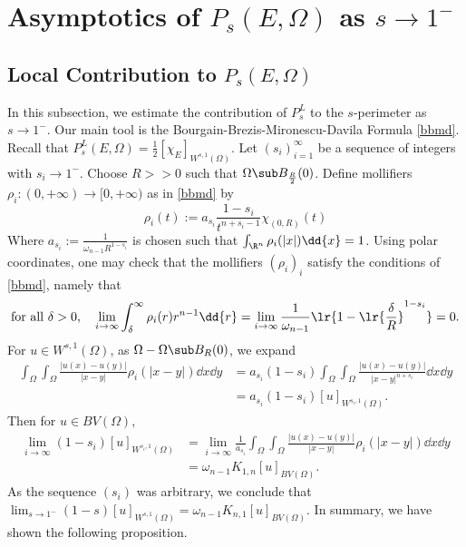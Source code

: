 \documentclass[../main.tex]{subfiles}
\begin{document}
\section{Asymptotics of $ P_{s}(E,\Omega) $ as $ s\to 1^{-} $}

\subsection{Local Contribution to $ P_{s}(E,\Omega) $}

In this subsection, we estimate the contribution of $ P_{s}^{L} $ to the $ s $-perimeter as $ s\to1^{-} $. Our main tool is the Bourgain-Brezis-Mironescu-Davila Formula \ref{bbmd}.\\

Recall that $ P_{s}^{L}(E,\Omega) = \frac{1}{2}[ \chi_{E} ]_{W^{s,1}(\Omega)} $. Let $ (s_{i})_{i=1}^{\infty} $ be a sequence of integers with $ s_{i}\to1^{-} $. Choose $ R>>0 $ such that $ \Omega\sub B_{\frac{R}{2}}(0) $. Define mollifiers $ \rho_{i}:(0,+\infty)\to[0,+\infty) $ as in \ref{bbmd} by
\begin{equation}\label{mollifiers}
    \rho_{i}(t):= a_{s_{i}}\frac{1-s_{i}}{t^{n+s_{i}-1}}\chi_{(0,R)}(t)
\end{equation}
Where $ a_{s_{i}} := \frac{1}{\omega_{n-1}R^{1-s_{i}}}$ is chosen such that $ \int_{\R^{n}} \rho_{i}(|x|)\dd{x} = 1 $. Using polar coordinates, one may check that the mollifiers $ (\rho_{i})_{i} $ satisfy the conditions of \ref{bbmd}, namely that
\[
    \text{for all } \delta>0,\quad\lim_{i\to\infty}\int_{\delta}^{\infty} \rho_{i}(r)r^{n-1}\dd{r} = \lim_{i\to\infty} \frac{1}{\omega_{n-1}} \lr{1-\lr{\frac{\delta}{R}}^{1-s_{i}}} = 0.
\]
For $ u\in W^{s,1}(\Omega) $, as $ \Omega-\Omega\sub B_{R}(0) $, we expand 
\begin{align*}
    \int_{\Omega} \int_{\Omega} \frac{|u(x)-u(y)|}{|x-y|} \rho_{i}(|x-y|) \dd{x}\dd{y} &= a_{s_{i}}(1-s_{i})\int_{\Omega}\int_{\Omega} \frac{|u(x)-u(y)|}{|x-y|^{n+s_{i}}}\dd{x}\dd{y} \\
    &= a_{s_{i}}(1-s_{i})[u]_{W^{s_{i},1}(\Omega)}.
\end{align*}
Then for $ u\in BV(\Omega) $,
\begin{align*}
    \lim_{i\to\infty} (1-s_{i}) [u]_{W^{s_{i},1}(\Omega)} &= \lim_{i\to\infty}\frac{1}{a_{s_{i}}}\int_{\Omega} \int_{\Omega} \frac{|u(x)-u(y)|}{|x-y|} \rho_{i}(|x-y|) \dd{x}\dd{y} \\
    &= \omega_{n-1}K_{1,n}[u]_{BV(\Omega)}.
\end{align*}
As the sequence $ (s_{i}) $ was arbitrary, we conclude that $ \lim_{s\to1^{-}}(1-s)[u]_{W^{s,1}(\Omega)} = \omega_{n-1}K_{n,1}[u]_{BV(\Omega)} $. In summary, we have shown the following proposition.
\end{document}
